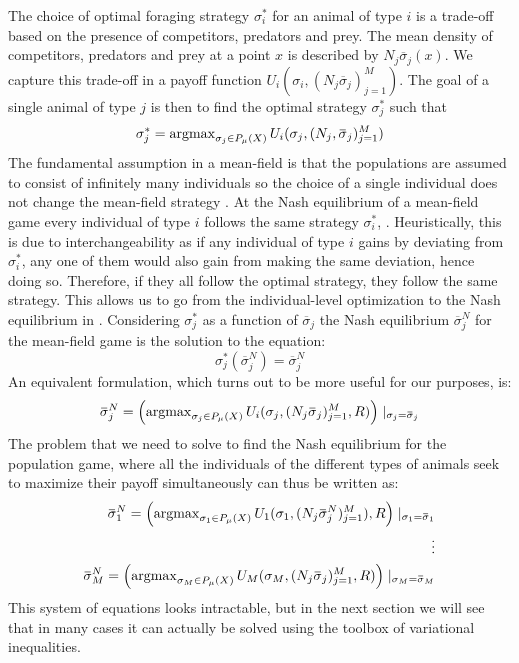 The choice of optimal foraging strategy $\sigma_i^*$ for an animal of type $i$ is a trade-off based on the presence of competitors, predators and prey. The mean density of competitors, predators and prey at a point $x$ is described by $N_j \overbar{\sigma}_j(x)$. We capture this trade-off in a payoff function $U_i(\sigma_i, (N_j \overbar{\sigma}_j)_{j=1}^M)$. The goal of a single animal of type $j$ is then to find the optimal strategy $\sigma_j^*$ such that
\begin{equation}
  \label{eq:ind_opt}
  \sigma^*_j = \argmax_{\sigma_j \in P_{\mu}(X)} U_i(\sigma_j, (N_j, \overbar{\sigma}_j)_{j=1}^M)
\end{equation}
The fundamental assumption in a mean-field is that the populations are assumed to consist of infinitely many individuals so the choice of a single individual does not change the mean-field strategy \citep{aumann1964markets}. At the Nash equilibrium of a mean-field game every individual of type $i$ follows the same strategy $\sigma_i^*$, \citep{lasry2007mean}. Heuristically, this is due to interchangeability as if any individual of type $i$ gains by deviating from $\sigma_i^*$, any one of them would also gain from making the same deviation, hence doing so. Therefore, if they all follow the optimal strategy, they follow the same strategy. This allows us to go from the individual-level optimization to the Nash equilibrium in . Considering $\sigma^*_{j}$ as a function of $\overbar{\sigma}_j$ the Nash equilibrium $\overbar{\sigma}_j^N$ for the mean-field game is the solution to the equation:
\begin{equation}
  \sigma^*_{j}(\overbar{\sigma}^N_j) = \overbar{\sigma}^N_j
\end{equation}
An equivalent formulation, which turns out to be more useful for our purposes, is:
\begin{equation}
  \label{eq:mfg_ne}
  \overbar{\sigma}_j^N = \pa{\argmax_{\sigma_j \in P_{\mu}(X)} U_i(\sigma_j, (N_j \overbar{\sigma}_j)_{j=1}^M, R) } \mid_{\sigma_j = \overbar{\sigma}_j}
\end{equation}
The problem that we need to solve to find the Nash equilibrium for the population game, where all the individuals of the different types of animals seek to maximize their payoff simultaneously can thus be written as:
\begin{equation}
  \label{eq:tot_nash_eq}
  \begin{split}
    \overbar{\sigma}_1^N = \pa{\argmax_{\sigma_1 \in P_{\mu}(X)} U_1(\sigma_1, (N_j \overbar{\sigma}^N_j)_{j=1}^M), R } \mid_{\sigma_1 = \overbar{\sigma}_1} \\
    \vdots \\
    \overbar{\sigma}_M^N = \pa{\argmax_{\sigma_M \in P_{\mu}(X)} U_M(\sigma_M, (N_j \overbar{\sigma}_j)_{j=1}^M, R) } \mid_{\sigma_M = \overbar{\sigma}_M}
    \end{split}
\end{equation}
This system of equations looks intractable, but in the next section we will see that in many cases it can actually be solved using the toolbox of variational inequalities.



